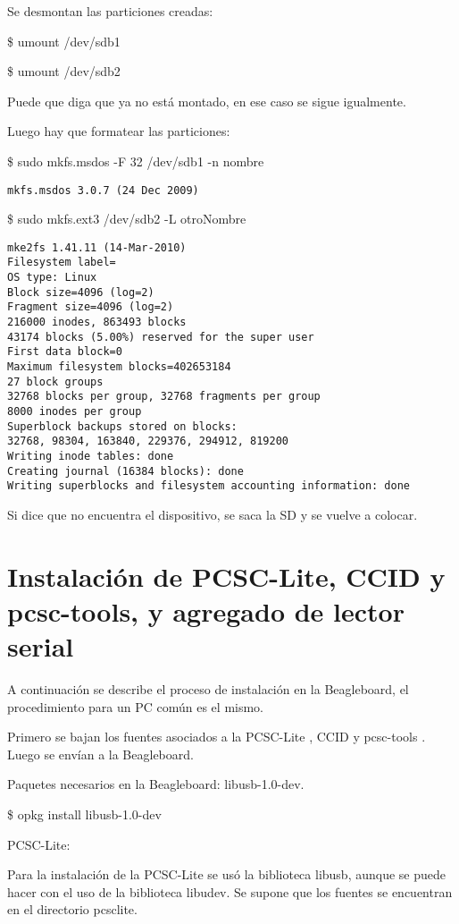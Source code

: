 Se desmontan las particiones creadas: 

\bigskip
\centerline{\$ umount /dev/sdb1}

\centerline{\$ umount /dev/sdb2}

\bigskip
Puede que diga que ya no está montado, en ese caso se sigue igualmente. 

\bigskip
Luego hay que formatear las particiones: 

\bigskip
\centerline{\$ sudo mkfs.msdos -F 32 /dev/sdb1 -n nombre}

\begin{verbatim}
mkfs.msdos 3.0.7 (24 Dec 2009) 
\end{verbatim}

\centerline{\$ sudo mkfs.ext3 /dev/sdb2 -L otroNombre}
\begin{verbatim}
mke2fs 1.41.11 (14-Mar-2010) 
Filesystem label= 
OS type: Linux 
Block size=4096 (log=2) 
Fragment size=4096 (log=2) 
216000 inodes, 863493 blocks 
43174 blocks (5.00%) reserved for the super user 
First data block=0 
Maximum filesystem blocks=402653184 
27 block groups 
32768 blocks per group, 32768 fragments per group 
8000 inodes per group 
Superblock backups stored on blocks: 
32768, 98304, 163840, 229376, 294912, 819200 
Writing inode tables: done 
Creating journal (16384 blocks): done 
Writing superblocks and filesystem accounting information: done
\end{verbatim}

\bigskip
Si dice que no encuentra el dispositivo, se saca la SD y se vuelve a colocar.

\section{Instalación de PCSC-Lite, CCID y pcsc-tools, y agregado de lector serial}\label{anx_pcsc_inst}

A continuación se describe el proceso de instalación en la Beagleboard, el procedimiento para un PC común es el mismo.

\bigskip
Primero se bajan los fuentes asociados a la PCSC-Lite \cite{pcsc/ccid_down}, CCID \cite{pcsc/ccid_down} y pcsc-tools \cite{pcsctools_down}. Luego se envían a la Beagleboard.

\bigskip
Paquetes necesarios en la Beagleboard: libusb-1.0-dev.

\bigskip
\centerline{\$ opkg install libusb-1.0-dev}

\bigskip
PCSC-Lite:

\bigskip
Para la instalación de la PCSC-Lite se usó la biblioteca libusb, aunque se puede hacer con el uso de la biblioteca libudev.
Se supone que los fuentes se encuentran en el directorio pcsclite.

